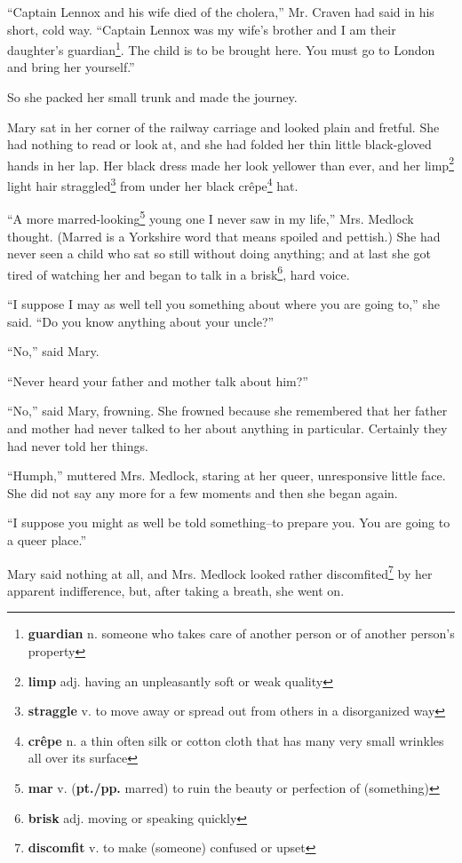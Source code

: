 ``Captain Lennox and his wife died of the cholera,'' Mr. Craven had said in his short, cold way. ``Captain Lennox was my wife's brother and I am their daughter's guardian\footnote{\textbf{guardian} n. someone who takes care of another person or of another person's property}. The child is to be brought here. You must go to London and bring her yourself.''

So she packed her small trunk and made the journey.

Mary sat in her corner of the railway carriage and looked plain and fretful. She had nothing to read or look at, and she had folded her thin little black-gloved hands in her lap. Her black dress made her look yellower than ever, and her limp\footnote{\textbf{limp} adj. having an unpleasantly soft or weak quality} light hair straggled\footnote{\textbf{straggle} v. to move away or spread out from others in a disorganized way} from under her black cr\^{e}pe\footnote{\textbf{cr\^{e}pe} n. a thin often silk or cotton cloth that has many very small wrinkles all over its surface} hat.

``A more marred-looking\footnote{\textbf{mar} v. (\textbf{pt./pp.} marred) to ruin the beauty or perfection of (something)} young one I never saw in my life,'' Mrs. Medlock thought. (Marred is a Yorkshire word that means spoiled and pettish.) She had never seen a child who sat so still without doing anything; and at last she got tired of watching her and began to talk in a brisk\footnote{\textbf{brisk} adj. moving or speaking quickly }, hard voice.

``I suppose I may as well tell you something about where you are going to,'' she said. ``Do you know anything about your uncle?''

``No,'' said Mary.

``Never heard your father and mother talk about him?''

``No,'' said Mary, frowning. She frowned because she remembered that her father and mother had never talked to her about anything in particular. Certainly they had never told her things.

``Humph,'' muttered Mrs. Medlock, staring at her queer, unresponsive little face. She did not say any more for a few moments and then she began again.

``I suppose you might as well be told something--to prepare you. You are going to a queer place.''

Mary said nothing at all, and Mrs. Medlock looked rather discomfited\footnote{\textbf{discomfit} v. to make (someone) confused or upset} by her apparent indifference, but, after taking a breath, she went on.
